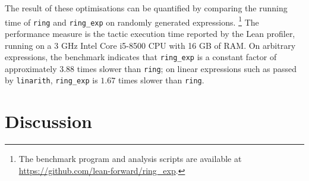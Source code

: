 \documentclass{llncs}
\newcommand{\lean}[1]{\texttt{#1}\xspace} %
\newcommand{\mathlib}{\texttt{mathlib}\xspace}
\newcommand{\ring}{\lean{ring}}
\newcommand{\ringexp}{\lean{ring\_exp}}
\begin{document}
The result of these optimisations can be quantified by comparing the running time of \ring and \ringexp on randomly generated expressions.%
\footnote{The benchmark program and analysis scripts are available at \url{https://github.com/lean-forward/ring_exp}.}
The performance measure is the tactic execution time reported by the Lean profiler,
running on a 3 GHz Intel\textregistered\xspace Core\texttrademark\xspace i5-8500 CPU with 16 GB of RAM.
On arbitrary expressions, the benchmark indicates that \ringexp is a constant factor of approximately $3.88$ times slower than \ring;
on linear expressions such as passed by \lean{linarith},
\ringexp is $1.67$ times slower than \ring.

% 

%
%


\section{Discussion}
\end{document}
